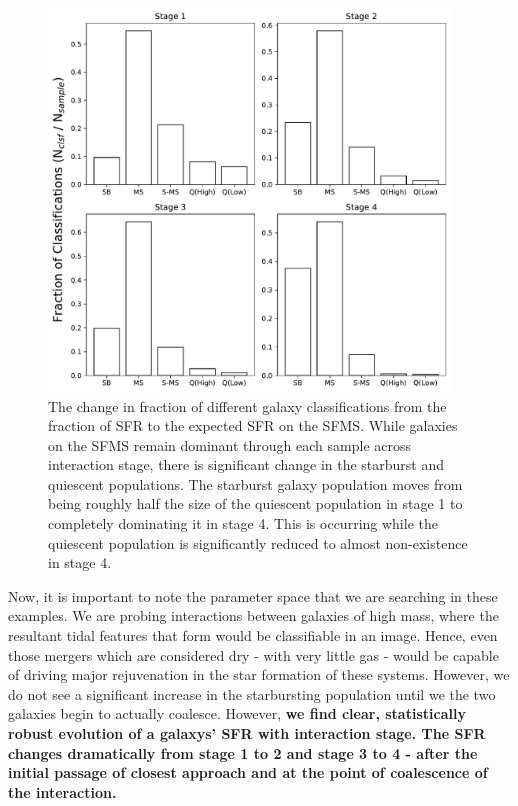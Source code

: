 \begin{figure}
    \centering
    \includegraphics[width=0.95\textwidth]{Chapter3/figures/sfr-clsf-bar.pdf}
    \caption{The change in fraction of different galaxy classifications from the fraction of SFR to the expected SFR on the SFMS. While galaxies on the SFMS remain dominant through each sample across interaction stage, there is significant change in the starburst and quiescent populations. The starburst galaxy population moves from being roughly half the size of the quiescent population in stage 1 to completely dominating it in stage 4. This is occurring while the quiescent population is significantly reduced to almost non-existence in stage 4.}
    \label{fig:sfr-clsf-bar}
\end{figure}

Now, it is important to note the parameter space that we are searching in these examples. We are probing interactions between galaxies of high mass, where the resultant tidal features that form would be classifiable in an image. Hence, even those mergers which are considered dry - with very little gas - would be capable of driving major rejuvenation in the star formation of these systems. However, we do not see a significant increase in the starbursting population until we the two galaxies begin to actually coalesce. However, \textbf{we find clear, statistically robust evolution of a galaxys' SFR with interaction stage. The SFR changes dramatically from stage 1 to 2 and stage 3 to 4 - after the initial passage of closest approach and at the point of coalescence of the interaction.}

